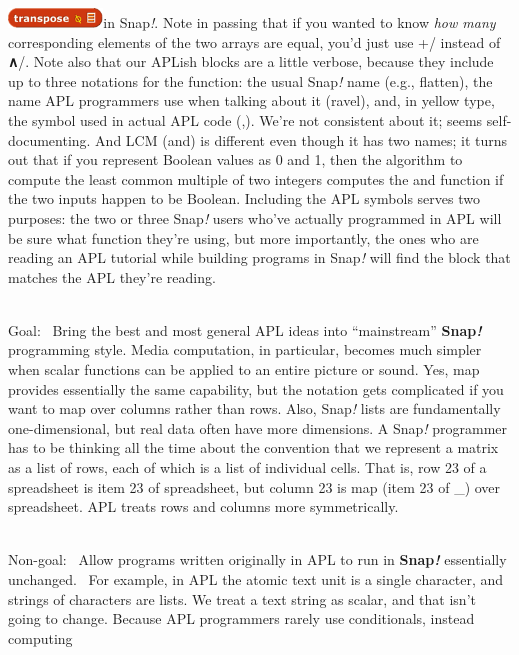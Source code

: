 \includegraphics[width=0.99306in,height=0.20833in]{media/image1264.png}in
Snap\emph{!}. Note in passing that if you wanted to know \emph{how many}
corresponding elements of the two arrays are equal, you'd just use +/
instead of \textbf{∧}/. Note also that our APLish blocks are a little
verbose, because they include up to three notations for the function:
the usual Snap\emph{!} name (e.g., flatten), the name APL programmers
use when talking about it (ravel), and, in yellow type, the symbol used
in actual APL code (,). We're not consistent about it; seems
self-documenting. And LCM (and) is different even though it has two
names; it turns out that if you represent Boolean values as 0 and 1,
then the algorithm to compute the least common multiple of two integers
computes the and function if the two inputs happen to be Boolean.
Including the APL symbols serves two purposes: the two or three
Snap\emph{!} users who've actually programmed in APL will be sure what
function they're using, but more importantly, the ones who are reading
an APL tutorial while building programs in Snap\emph{!} will find the
block that matches the APL they're reading.\\
\strut \\
Goal:~ Bring the best and most general APL ideas into ``mainstream''
\textbf{Snap\emph{!}} programming style. Media computation, in
particular, becomes much simpler when scalar functions can be applied to
an entire picture or sound. Yes, map provides essentially the same
capability, but the notation gets complicated if you want to map over
columns rather than rows. Also, Snap\emph{!} lists are fundamentally
one-dimensional, but real data often have more dimensions. A
Snap\emph{!} programmer has to be thinking all the time about the
convention that we represent a matrix as a list of rows, each of which
is a list of individual cells. That is, row 23 of a spreadsheet is item
23 of spreadsheet, but column 23 is map (item 23 of \_) over
spreadsheet. APL treats rows and columns more symmetrically.\\
\strut \\
Non-goal:~ Allow programs written originally in APL to run in
\textbf{Snap\emph{!}} essentially unchanged.~ For example, in APL the
atomic text unit is a single character, and strings of characters are
lists. We treat a text string as scalar, and that isn't going to change.
Because APL programmers rarely use conditionals, instead computing
